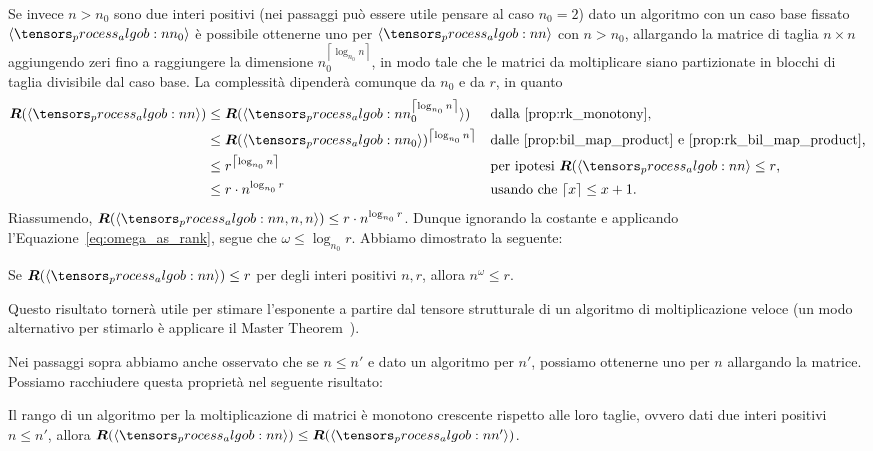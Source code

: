 Se invece $ n > n_0 $ sono due interi positivi (nei passaggi può essere utile pensare al caso $ n_0 = 2 $) dato un algoritmo con un caso base fissato $
	\algob{n_0} $ è possibile ottenerne uno per
$ \algob{n} $ con $ n >  n_0 $, allargando la matrice di taglia $ n \times  n $ aggiungendo zeri
fino a raggiungere la dimensione
$ n_0^{\left\lceil \log_{n_0} n \right\rceil } $, in modo tale che le matrici da moltiplicare siano
partizionate in blocchi di taglia divisibile dal caso base. La complessità dipenderà comunque da $ n_0 $ e
da $ r $, in quanto
\begin{equation*}
	\begin{aligned}
		\rk(\algob{n}) & \le \rk(\algob{n_0^{\left\lceil \log_{n_0} n \right\rceil }}) &  & \text{dalla
		\ref{prop:rk_monotony},}                                                                                                              \\
		               & \le \rk(\algob{n_0})^{\left\lceil \log_{n_0} n \right\rceil } &  & \text{dalle
		\ref{prop:bil_map_product} e \ref{prop:rk_bil_map_product},}                                                                          \\
		               & \le r^{\left\lceil \log_{n_0} n \right\rceil }                &  & \text{per ipotesi $
		\rk(\algob{n}\le r $,}                                                                                                                \\
		               & \le r \cdot n^{\log_{n_0} r}                                  &  & \text{usando che $ \left\lceil x \right\rceil \le
				x+1$}.
	\end{aligned}
\end{equation*}
Riassumendo, $ \rk(\algob{n,n,n}) \le r \cdot n^{\log_{n_0} r} $. Dunque ignorando la costante e
applicando l'Equazione~\eqref{eq:omega_as_rank}, segue che $ \omega \le \log_{n_0} r $.
Abbiamo dimostrato la seguente:
\begin{proposition}
	\label{prop:omega_rk_estimate}
	Se $ \rk(\algob{n}) \le r$ per degli interi positivi $ n,r $, allora $ n^\omega \le r $.
\end{proposition}
\begin{remark}
	Questo risultato tornerà utile per stimare l'esponente a partire dal tensore strutturale di un
	algoritmo di moltiplicazione veloce (un modo alternativo per stimarlo è applicare il Master
	Theorem~\cite{cormen2022introduction}).
\end{remark}
Nei passaggi sopra abbiamo anche osservato che se $ n \le n' $ e dato un algoritmo per $ n' $, possiamo ottenerne uno per $ n $
allargando la matrice. Possiamo racchiudere questa proprietà nel seguente risultato:
\begin{proposition}
	\label{prop:rk_monotony}
	Il rango di un algoritmo per la moltiplicazione di matrici è monotono crescente rispetto alle loro
	taglie, ovvero dati due interi positivi $ n \le n' $, allora $
		\rk(\algob{n}) \le \rk(\algob{n'}) $.
\end{proposition}




